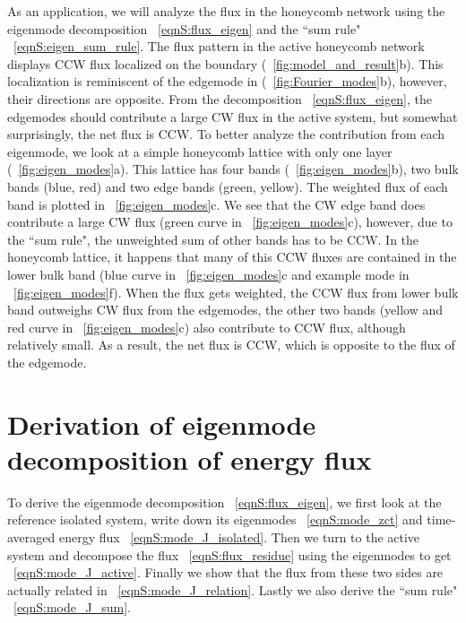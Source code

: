 \documentclass[
 amsmath,amssymb,
 aps,
 pre,
 longbibliography,
 10pt, onecolumn,
 notitlepage
]{revtex4-1}
\begin{document}
As an application, we will analyze the flux in the honeycomb network using the eigenmode decomposition \eqnname~\eqref{eqnS:flux_eigen} and the ``sum rule" \eqnname~\eqref{eqnS:eigen_sum_rule}.
The flux pattern in the active honeycomb network displays CCW flux localized on the boundary (\figurename~\ref{fig:model_and_result}b). This localization is reminiscent of the edgemode in \cite{Nash2015TopologicalMechanics} (\figurename~\ref{fig:Fourier_modes}b), however, their directions are opposite.
From the decomposition \eqnname~\eqref{eqnS:flux_eigen}, the edgemodes should contribute a large CW flux in the active system, but somewhat surprisingly, the net flux is CCW.
To better analyze the contribution from each eigenmode, we look at a simple honeycomb lattice with only one layer (\figurename~\ref{fig:eigen_modes}a).
This lattice has four bands (\figurename~\ref{fig:eigen_modes}b), two bulk bands (blue, red) and two edge bands (green, yellow). The weighted flux of each band is plotted in \figurename~\ref{fig:eigen_modes}c. We see that the CW edge band does contribute a large CW flux (green curve in \figurename~\ref{fig:eigen_modes}c), however, due to the ``sum rule", the unweighted sum of other bands has to be CCW. In the honeycomb lattice, it happens that many of this CCW fluxes are contained in the lower bulk band (blue curve in \figurename~\ref{fig:eigen_modes}c and example mode in \figurename~\ref{fig:eigen_modes}f). When the flux gets weighted, the CCW flux from lower bulk band outweighs CW flux from the edgemodes, the other two bands (yellow and red curve in \figurename~\ref{fig:eigen_modes}c) also contribute to CCW flux, although relatively small. As a result, the net flux is CCW, which is opposite to the flux of the edgemode.


\section{Derivation of eigenmode decomposition of energy flux}

To derive the eigenmode decomposition \eqnname~\eqref{eqnS:flux_eigen}, we first look at the reference isolated system, write down its eigenmodes \eqnname~\eqref{eqnS:mode_zct} and time-averaged energy flux \eqnname~\eqref{eqnS:mode_J_isolated}. Then we turn to the active system and decompose the flux \eqnname~\eqref{eqnS:flux_residue} using the eigenmodes to get \eqnname~\eqref{eqnS:mode_J_active}. Finally we show that the flux from these two sides are actually related in \eqnname~\eqref{eqnS:mode_J_relation}.
Lastly we also derive the ``sum rule" \eqnname~\eqref{eqnS:mode_J_sum}.
\end{document}
